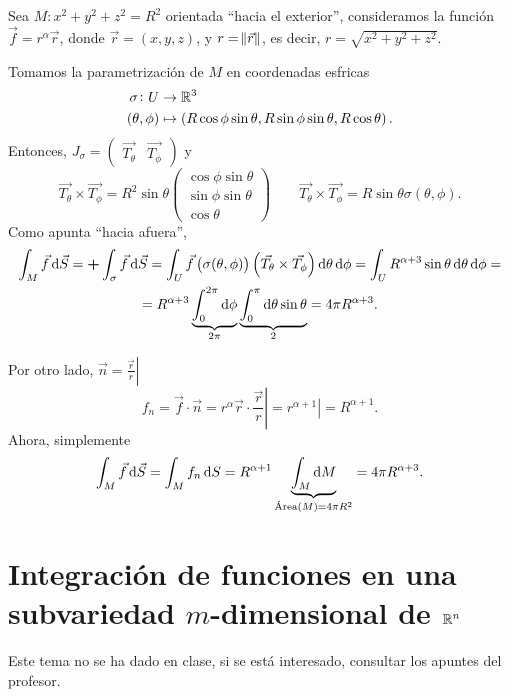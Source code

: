 \begin{example*}
    Sea $M : x^2 + y^2 + z^2 = R^2$ orientada ``hacia el exterior'', consideramos la función $\vec{f} = r^\alpha \vec{r}$, donde
    $\vec{r} = (x,y,z)$, y $r = \norm{\vec{r}}$, es decir, $r = \sqrt{x^2 + y^2 + z^2}$.

    Tomamos la parametrización de $M$ en coordenadas esfricas
    \[
        \begin{aligned}
            \sigma \colon U &\to \mathbb{R}^3 \\
            (\theta, \phi) &\mapsto \left( R \cos \phi \sin \theta, R\sin \phi \sin \theta, R\cos \theta \right).
        \end{aligned}
    \]
    Entonces, $J_\sigma = \begin{pmatrix} \vec{T_\theta} & \vec{T_\phi} \end{pmatrix}$ y
    \[
        \vec{T_\theta} \times \vec{T_\phi} = R^2 \sin\theta
        \begin{pmatrix}
            \cos\phi\sin\theta \\ \sin\phi\sin\theta \\ \cos\theta
        \end{pmatrix} \qquad
        \vec{T_\theta} \times \vec{T_\phi} = R \sin\theta \sigma(\theta, \phi).
    \]
    Como apunta ``hacia afuera'', 
    \begin{gather*}
        \int_M \vec{f} \dif \vec{S} = \textbf{+} \int_\sigma \vec{f} \dif \vec{S} = 
        \int_U \vec{f} \left( \sigma(\theta, \phi)\right) \left( \vec{T_\theta} \times \vec{T_\phi} \right) \dif \theta \dif \phi =
        \int_U R^{\alpha+3} \sin \theta \dif \theta \dif \phi =\\= R^{\alpha+3} \underbrace{\int^{2\pi}_0 \dif \phi}_{2\pi}
        \underbrace{ \int^\pi_0 \dif \theta \sin \theta }_{2} = 4\pi R^{\alpha+3}.
    \end{gather*}

    Por otro lado, $\vec{n} = \left. \frac{\vec{r}}{r} \right\vert$
    \[
        f_n = \vec{f} \cdot \vec{n} = r^{\alpha} \vec{r} \cdot \left.\frac{\vec{r}}{r}\right\vert = \left. r^{\alpha+1}\right\vert = R^{\alpha+1}.
    \]
    Ahora, simplemente
    \[
        \int_M \vec{f} \dif \vec{S} = \int_M f_n \dif S = R^{\alpha+1} \underbrace{\int_M \dif M}_{\text{Área}(M) = 4\pi R^2} = 4\pi R^{\alpha+3}.
    \]
\end{example*}

\section{Integración de funciones en una subvariedad $m$-dimensional de $\mathbb{R}^n$}

Este tema no se ha dado en clase, si se está interesado, consultar los apuntes del profesor.
